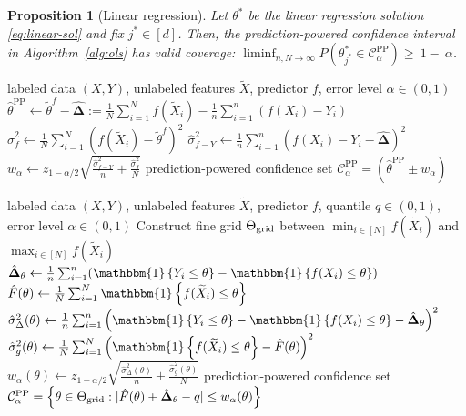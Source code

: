 \documentclass[10pt]{article}
\newtheorem{prop}{Proposition}
\newcommand{\ind}[1]{\mathbbm{1}\left\{#1\right\}}
\newcommand{\Xa}{X}
\newcommand{\Xt}{\widetilde{X}}
\newcommand{\Ya}{Y}
\newcommand{\thetaf}{\tilde{\theta}^{f}}
\newcommand{\thetaPP}{\hat{\theta}^{\mathrm{PP}}}
\newcommand{\rechat}{\hat{\mathbf{\Delta}}}
\newcommand{\CPP}{\mathcal{C}^{\mathrm{PP}}}
\begin{document}
\begin{prop}[Linear regression]
\label{prop:ols}
Let $\theta^*$ be the linear regression solution \eqref{eq:linear-sol} and fix $j^*\in[d]$. Then, 
the prediction-powered confidence interval in Algorithm~\ref{alg:ols} has valid coverage: $\liminf_{n,N\rightarrow\infty}P\left(\theta^*_{j^*} \in  \CPP_\alpha\right) \ge~1-~\alpha$.
\end{prop}




\begin{algorithm}[H]
\caption{Prediction-powered mean estimation}
\label{alg:means}
\begin{algorithmic}[1]
\Require labeled data $(\Xa, \Ya)$, unlabeled features $\Xt$, predictor $f$, error level $\alpha\in(0,1)$
\State $\thetaPP \leftarrow \thetaf - \rechat := \frac{1}{N}\sum_{i=1}^N f(\Xt_i) - \frac{1}{n}\sum_{i=1}^n (f(X_i) - Y_i)$ 
\State $\hat \sigma_{f}^2 \leftarrow \frac 1 N \sum_{i=1}^N (f(\Xt_i) - \thetaf)^2$ 
\State $\hat \sigma_{f-Y}^2 \leftarrow \frac 1 n \sum_{i=1}^n (f(X_i) - Y_i - \rechat )^2$ 
\State $w_\alpha \leftarrow z_{1-\alpha/2} \sqrt{\frac{\hat\sigma_{f-Y}^2}{n} + \frac{\hat\sigma_{f}^2}{N}}$ 
\Ensure 
prediction-powered confidence set $\CPP_\alpha = \left(\thetaPP \pm w_\alpha\right)$
\end{algorithmic}
\end{algorithm}

\vspace{-.4cm}

\begin{algorithm}[H]
\caption{Prediction-powered quantile estimation}
\label{alg:quantile}
\begin{algorithmic}[1]
\Require labeled data $(\Xa, \Ya)$, unlabeled features $\Xt$, predictor $f$, quantile $q\in(0,1)$, error level $\alpha\in(0,1)$
\State Construct fine grid $\Theta_{\rm grid}$ between $\min_{i\in[N]} f(\Xt_i)$ and $\max_{i\in[N]} f(\Xt_i)$ 
\State $\rechat_{\theta} \leftarrow \frac{1}{n}\sum_{i=1}^n (\ind{Y_i \leq \theta} - \ind{f(X_i) \leq \theta})$ 
\State $\hat F(\theta)  \leftarrow \frac{1}{N}\sum_{i=1}^N  \ind{f(\Xt_i) \leq \theta}$ 
\State $\hat{\sigma}_\Delta^2(\theta)  \leftarrow \frac{1}{n}\sum_{i=1}^n\left(\ind{Y_i \leq \theta} - \ind{f(X_i) \leq \theta} - \rechat_{\theta}\right)^2$ 
\State $\hat{\sigma}_{g}^2(\theta) \gets \frac{1}{N}\sum_{i=1}^N\left(\ind{f(\Xt_i) \leq \theta} - \hat F(\theta) \right)^2$ 
\State $w_\alpha(
\theta) \leftarrow z_{1-\alpha/2}\sqrt{\frac{\hat{\sigma}^2_\Delta(\theta)}{n} + \frac{\hat{\sigma}^2_{g}(\theta)}{N}}$ 
\EndFor
\Ensure 
prediction-powered confidence set $\CPP_\alpha = \left\{ \theta \in \Theta_{\rm grid} :  |\hat F(\theta) + \rechat_{\theta} - q|  \leq w_\alpha(\theta) \right\}$
\end{algorithmic}
\end{algorithm}
\end{document}
